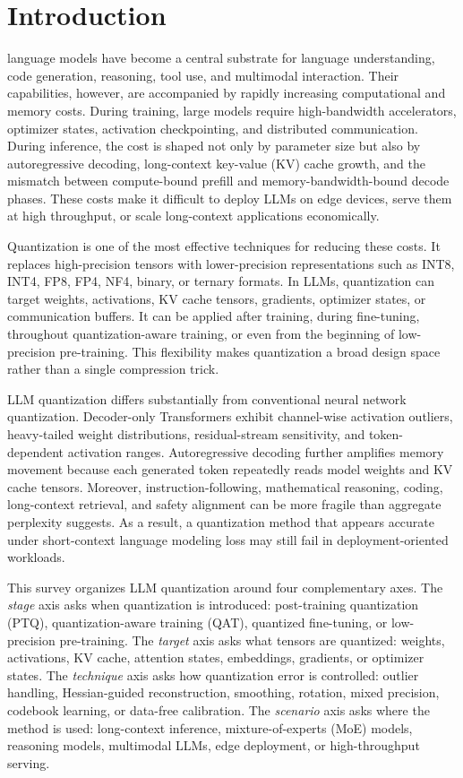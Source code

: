 \documentclass[journal,10pt]{IEEEtran}
\begin{document}
\section{Introduction}
 language models have become a central substrate for language understanding, code generation, reasoning, tool use, and multimodal interaction. Their capabilities, however, are accompanied by rapidly increasing computational and memory costs. During training, large models require high-bandwidth accelerators, optimizer states, activation checkpointing, and distributed communication. During inference, the cost is shaped not only by parameter size but also by autoregressive decoding, long-context key-value (KV) cache growth, and the mismatch between compute-bound prefill and memory-bandwidth-bound decode phases. These costs make it difficult to deploy LLMs on edge devices, serve them at high throughput, or scale long-context applications economically.

Quantization is one of the most effective techniques for reducing these costs. It replaces high-precision tensors with lower-precision representations such as INT8, INT4, FP8, FP4, NF4, binary, or ternary formats. In LLMs, quantization can target weights, activations, KV cache tensors, gradients, optimizer states, or communication buffers. It can be applied after training, during fine-tuning, throughout quantization-aware training, or even from the beginning of low-precision pre-training. This flexibility makes quantization a broad design space rather than a single compression trick.

LLM quantization differs substantially from conventional neural network quantization. Decoder-only Transformers exhibit channel-wise activation outliers, heavy-tailed weight distributions, residual-stream sensitivity, and token-dependent activation ranges. Autoregressive decoding further amplifies memory movement because each generated token repeatedly reads model weights and KV cache tensors. Moreover, instruction-following, mathematical reasoning, coding, long-context retrieval, and safety alignment can be more fragile than aggregate perplexity suggests. As a result, a quantization method that appears accurate under short-context language modeling loss may still fail in deployment-oriented workloads.

This survey organizes LLM quantization around four complementary axes. The \emph{stage} axis asks when quantization is introduced: post-training quantization (PTQ), quantization-aware training (QAT), quantized fine-tuning, or low-precision pre-training. The \emph{target} axis asks what tensors are quantized: weights, activations, KV cache, attention states, embeddings, gradients, or optimizer states. The \emph{technique} axis asks how quantization error is controlled: outlier handling, Hessian-guided reconstruction, smoothing, rotation, mixed precision, codebook learning, or data-free calibration. The \emph{scenario} axis asks where the method is used: long-context inference, mixture-of-experts (MoE) models, reasoning models, multimodal LLMs, edge deployment, or high-throughput serving.
\end{document}
